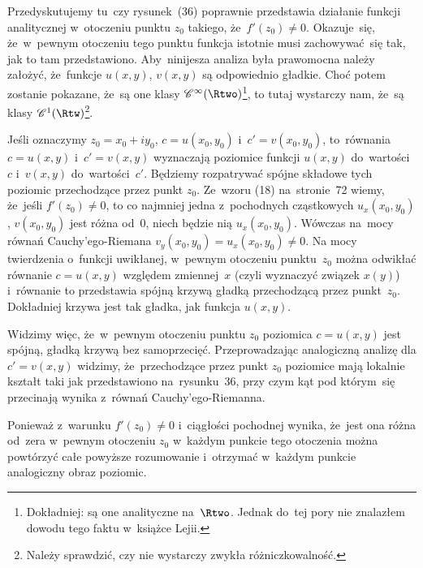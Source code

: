 \documentclass[a4paper,11pt]{article}
\begin{document}
\vspace{\spaceFour}


\start {} Przedyskutujemy tu~czy rysunek~(36) poprawnie
przedstawia działanie funkcji analitycznej w~otoczeniu punktu
$z_{ 0 }$ takiego, że~$f'( z_{ 0 } ) \neq 0$. Okazuje~się, że~w~pewnym
otoczeniu tego punktu funkcja istotnie musi zachowywać~się tak, jak to
tam przedstawiono. Aby~ninijesza analiza była prawomocna należy
założyć, że~funkcje $u( x, y )$, $v( x, y )$ są odpowiednio gładkie.
Choć potem zostanie pokazane, że~są one klasy
$\Cinfty( \Rtwo )$\footnote{Dokładniej: są one analityczne na~$\Rtwo$.
  Jednak do~tej pory nie znalazłem dowodu tego faktu w~książce
  Lejii.}, to tutaj wystarczy nam, że~są klasy
$\Cc^{ 1 }( \Rtw )$\footnote{Należy sprawdzić, czy nie wystarczy
  zwykła różniczkowalność.}.

Jeśli oznaczymy $z_{ 0 } = x_{ 0 } + i y_{ 0 }$,
$c = u( x_{ 0 }, y_{ 0 } )$ i~$c' = v( x_{ 0 }, y_{ 0 } )$,
to~równania $c = u( x, y )$ i~$c' = v( x, y )$ wyznaczają poziomice
funkcji $u( x, y )$ do~wartości~$c$ i~$v( x, y )$ do~wartości~$c'$.
Będziemy rozpatrywać spójne składowe tych poziomic przechodzące przez
punkt $z_{ 0 }$. Ze~wzoru (18) na~stronie~72 wiemy, że~jeśli
$f'( z_{ 0 } ) \neq 0$, to co najmniej jedna z~pochodnych cząstkowych
$u_{ x }( x_{ 0 }, y_{ 0 } )$, $v( x_{ 0 }, y_{ 0 } )$ jest różna
od~0, niech będzie nią $u_{ x }( x_{ 0 }, y_{ 0 } )$. Wówczas na~mocy
równań Cauchy'ego-Riemana
$v_{ y }( x_{ 0 }, y_{ 0 } ) = u_{ x }( x_{ 0 }, y_{ 0 } ) \neq 0$. Na
mocy twierdzenia o~funkcji uwikłanej, w~pewnym otoczeniu
punktu~$z_{ 0 }$ można odwikłać równanie $c = u( x, y )$ względem
zmiennej~$x$ (czyli wyznaczyć związek $x( y )$) i~równanie to
przedstawia spójną krzywą gładką przechodzącą przez punkt~$z_{ 0 }$.
Dokładniej krzywa jest tak gładka, jak funkcja $u( x, y )$.

Widzimy więc, że~w~pewnym otoczeniu punktu $z_{ 0 }$ poziomica
$c = u( x, y )$ jest spójną, gładką krzywą bez samoprzecięć.
Przeprowadzając analogiczną analizę dla $c' = v( x, y )$ widzimy,
że~przechodzące przez punkt $z_{ 0 }$ poziomice mają lokalnie kształt
taki jak przedstawiono na~rysunku~36, przy czym kąt pod którym~się
przecinają wynika z~równań Cauchy'ego-Riemanna.

Ponieważ z~warunku $f'( z_{ 0 } ) \neq 0$ i~ciągłości pochodnej
wynika, że~jest ona różna od~zera w~pewnym otoczeniu $z_{ 0 }$
w~każdym punkcie tego otoczenia można powtórzyć całe powyższe
rozumowanie i~otrzymać w~każdym punkcie analogiczny obraz poziomic.
\end{document}
